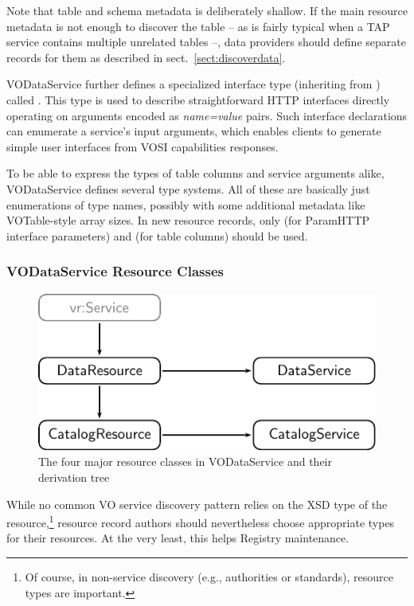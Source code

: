 \documentclass[11pt,a4paper]{ivoa}
\begin{document}
Note that table and schema metadata is deliberately shallow.  If the
main resource metadata is not enough to discover the table -- as is
fairly typical when a TAP service contains multiple unrelated tables --,
data providers should define separate records for them as described in
sect.~\ref{sect:discoverdata}.

VODataService further defines a specialized interface type
(inheriting from ) called
.  This type is used to describe
straightforward HTTP interfaces directly operating on
arguments encoded as
\emph{name=value} pairs.  Such interface declarations can
enumerate a service's input arguments, which enables clients
to generate simple
user interfaces from VOSI capabilities responses.

To be able to express the types of table columns and service arguments
alike, VODataService defines several type systems.  All of these are
basically just enumerations of type names, possibly with some additional
metadata like VOTable-style array sizes.  In new resource records, only
 (for ParamHTTP interface parameters) and
 (for table columns) should be used.

\subsubsection{VODataService Resource Classes}

\begin{figure}
\includegraphics{resclasses.pdf}
\caption{The four major resource classes in VODataService and their
derivation tree}
\label{fig:rescls}
\end{figure}

While no common VO service discovery pattern relies on the XSD type  of the
resource,\footnote{Of course, in non-service discovery (e.g., authorities
or standards), resource types are important.} resource
record authors should
nevertheless choose appropriate types for their resources.  At the
very least, this helps Registry maintenance.
\end{document}
